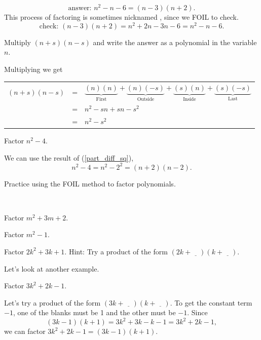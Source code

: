 \begin{exam}
\begin{apart}
\begin{soln}
                $$\text{answer: }n^2 -n-6 = (n-3)(n+2).$$
                This process of factoring is sometimes nicknamed , since we FOIL to check. 
                $$\text{check: }(n-3)(n+2)=n^2 + 2n-3n-6 = n^2-n-6.$$
            \end{soln}
        \item \label{part_diff_sq} Multiply $(n+s)(n-s)$ and write the answer as a polynomial in the variable $n$.
            \begin{soln}
                Multiplying we get
                \begin{center}
                    \begin{tabular}{lll}
                    $(n+s)(n-s)$ &=& $\underbrace{(n)(n)}_{\text{First}} 
                    +\underbrace{(n)(-s)}_{\text{Outside}} 
                    + \underbrace{(s)(n)}_{\text{Inside}} + \underbrace{(s)(-s)}_{\text{Last}}$ \\ 
                    &=& $n^2 - sn + sn - s^2$ \\
                    &=& $n^2-s^2$          
                    \end{tabular}
                \end{center}
            \end{soln}
        \item Factor $n^2 -4$.
            \begin{soln}
                We can use the result of (\ref{part_diff_sq}), $$n^2-4 = n^2-2^2=(n+2)(n-2).$$
            \end{soln}
    \end{apart}
\end{exam}

Practice using the FOIL method to factor polynomials.

\begin{act} 
\label{act_UNFOIL}
~
    \begin{apart}
        \item Factor $m^2+3m+2$.
        \item Factor $m^2-1$.
        \item Factor $2k^2+3k+1$. Hint:  Try a product of the form $(2k + \underline{\quad})(k+\underline{\quad})$. %
    \end{apart}
\end{act}

Let's look at another example.

\begin{exam}
\label{exam_factor_nonmonic_quad}
   Factor $3k^2+2k-1$.  
       \begin{soln}
           Let's try a product of the form $(3k + \underline{\quad})(k+\underline{\quad})$.
           To get the constant term $-1$, one of the blanks must be 1 and the other must be $-1$. Since $$(3k -1)(k+1)=3k^2+3k-k-1=3k^2+2k-1,$$ 
           we can factor $3k^2+2k-1 = (3k -1)(k+1)$.
       \end{soln}
\end{exam}

